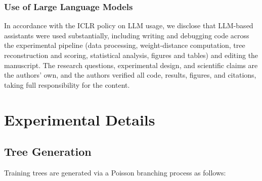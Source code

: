 \documentclass{article}
\theoremstyle{definition}
\theoremstyle{plain}
\begin{document}

\subsubsection*{Use of Large Language Models}
In accordance with the ICLR policy on LLM usage, we disclose that LLM-based assistants were used
substantially, including writing and debugging code across the experimental pipeline (data processing,
weight-distance computation, tree reconstruction and scoring, statistical analysis, figures and tables)
and editing the manuscript. The research questions, experimental design, and scientific claims are the
authors' own, and the authors verified all code, results, figures, and citations, taking full
responsibility for the content.





\appendix

\section{Experimental Details}
\label{app:details}

\subsection*{Tree Generation}
\label{app:tree-gen}

Training trees are generated via a Poisson branching process as follows:
\end{document}
